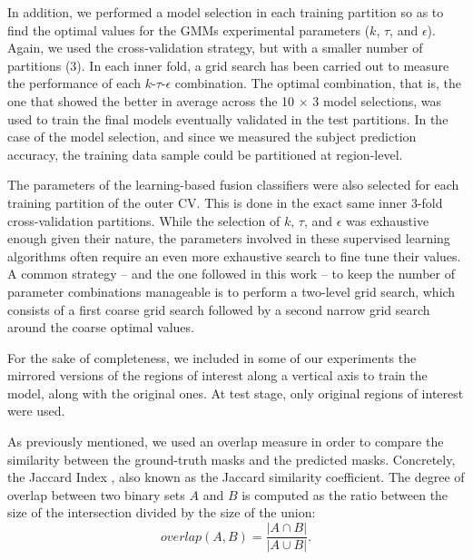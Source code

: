 \documentclass[10pt,twocolumn,letterpaper]{article}
\begin{document}

In addition, we performed a model selection in each training partition so as to find the optimal values for the GMMs experimental parameters ($k$, $\tau$, and $\epsilon$). Again, we used the cross-validation strategy, but with a smaller number of partitions (3). In each inner fold, a grid search has been carried out to measure the performance of each $k$-$\tau$-$\epsilon$ combination. The optimal combination, that is, the one that showed the better in average across the 10 $\times$ 3 model selections, was used to train the final models eventually validated in the test partitions. In the case of the model selection, and since we measured the subject prediction accuracy, the training data sample could be partitioned at region-level.

The parameters of the learning-based fusion classifiers were also selected for each training partition of the outer CV. This is done in the exact same inner 3-fold cross-validation partitions. While the selection of $k$, $\tau$, and $\epsilon$ was exhaustive enough given their nature, the parameters involved in these supervised learning algorithms often require an even more exhaustive search to fine tune their values. A common strategy -- and the one followed in this work -- to keep the number of parameter combinations manageable is to perform a two-level grid search, which consists of a first coarse grid search followed by a second narrow grid search around the coarse optimal values.

For the sake of completeness, we included in some of our experiments the mirrored versions of the regions of interest along a vertical axis to train the model, along with the original ones.  At test stage, only original regions of interest were used. 


As previously mentioned, we used an overlap measure in order to compare the similarity between the ground-truth masks and the predicted masks. Concretely, the Jaccard Index \cite{tan2002selecting}, also known as the Jaccard similarity coefficient. The degree of overlap between two binary sets $A$ and $B$ is computed as the ratio between the size of the intersection divided by the size of the union:
\begin{equation} \label{eq:jaccard}
overlap(A, B) = \frac{|A \cap B|}{|A \cup B|}.
\end{equation}
\end{document}
